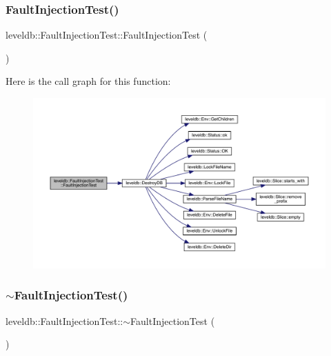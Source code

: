 \subsubsection{\texorpdfstring{FaultInjectionTest()}{FaultInjectionTest()}}
{\footnotesize\ttfamily leveldb\+::\+Fault\+Injection\+Test\+::\+Fault\+Injection\+Test (\begin{DoxyParamCaption}{ }\end{DoxyParamCaption})\hspace{0.3cm}{\ttfamily [inline]}}

Here is the call graph for this function\+:
\nopagebreak
\begin{figure}[H]
\begin{center}
\leavevmode
\includegraphics[width=350pt]{classleveldb_1_1_fault_injection_test_ae54ddb4aaf6bb2fb8dbd688164dd87f4_cgraph}
\end{center}
\end{figure}
\mbox{\label{classleveldb_1_1_fault_injection_test_a547ba383f26947152eb0c5045d5965c1}} 
\subsubsection{\texorpdfstring{$\sim$FaultInjectionTest()}{~FaultInjectionTest()}}
{\footnotesize\ttfamily leveldb\+::\+Fault\+Injection\+Test\+::$\sim$\+Fault\+Injection\+Test (\begin{DoxyParamCaption}{ }\end{DoxyParamCaption})\hspace{0.3cm}{\ttfamily [inline]}}

